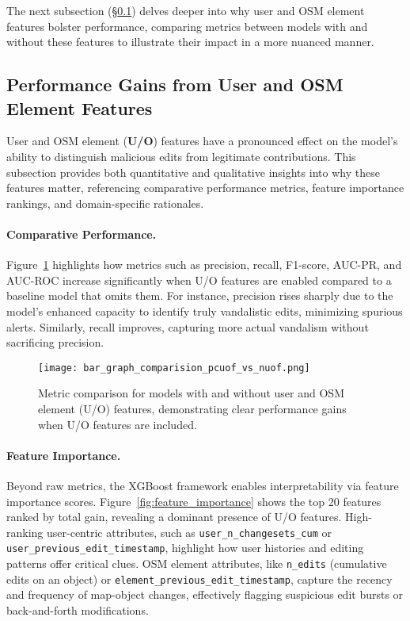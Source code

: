 \documentclass[
    13pt, %
    a4paper, %
    listof=totoc, %
    bibliography=totoc, %
    index=totoc, %
    headsepline
]{scrreprt}
\begin{document}
The next subsection (\S\ref{sec:importance_user_features}) delves deeper into why user and OSM element features bolster performance, comparing metrics between models with and without these features to illustrate their impact in a more nuanced manner.

\subsection{Performance Gains from User and OSM Element Features}
\label{sec:importance_user_features}

User and OSM element (\textbf{U/O}) features have a pronounced effect on the model’s ability to distinguish malicious edits from legitimate contributions. This subsection provides both quantitative and qualitative insights into why these features matter, referencing comparative performance metrics, feature importance rankings, and domain-specific rationales.

\paragraph{Comparative Performance.}
Figure~\ref{fig:bar_graph_comparison} highlights how metrics such as precision, recall, F1-score, AUC-PR, and AUC-ROC increase significantly when U/O features are enabled compared to a baseline model that omits them. For instance, precision rises sharply due to the model’s enhanced capacity to identify truly vandalistic edits, minimizing spurious alerts. Similarly, recall improves, capturing more actual vandalism without sacrificing precision.

\begin{figure}[H]
    \centering
    \texttt{[image: bar\_graph\_comparision\_pcuof\_vs\_nuof.png]}
    \caption{Metric comparison for models with and without user and OSM element (U/O) features, demonstrating clear performance gains when U/O features are included.}
    \label{fig:bar_graph_comparison}
\end{figure}

\paragraph{Feature Importance.}
Beyond raw metrics, the XGBoost framework enables interpretability via feature importance scores. Figure~\ref{fig:feature_importance} shows the top 20 features ranked by total gain, revealing a dominant presence of U/O features. High-ranking user-centric attributes, such as \texttt{user\_n\_changesets\_cum} or \texttt{user\_previous\_edit\_timestamp}, highlight how user histories and editing patterns offer critical clues. OSM element attributes, like \texttt{n\_edits} (cumulative edits on an object) or \texttt{element\_previous\_edit\_timestamp}, capture the recency and frequency of map-object changes, effectively flagging suspicious edit bursts or back-and-forth modifications.
\end{document}
